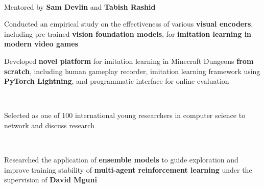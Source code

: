 \documentclass[]{lukas-cv-openfont}
\begin{document}
\noindent
{}
\\
\begin{tightitemize}{1.7em}
    \item Mentored by \textbf{Sam Devlin} and \textbf{Tabish Rashid}
    \item Conducted an empirical study on the effectiveness of various \textbf{visual encoders}, including pre-trained \textbf{vision foundation models}, for \textbf{imitation learning in modern video games} \cite{schaefer2023visual}
    \item Developed \textbf{novel platform} for imitation learning in Minecraft Dungeons \textbf{from scratch}, including human gameplay recorder, imitation learning framework using \textbf{PyTorch Lightning}, and programmatic interface for online evaluation
\end{tightitemize}
\sectionsep

\noindent
{}
\\
\begin{tightitemize}{1.7em}
    \item Selected as one of 100 international young researchers in computer science to network and discuss research
\end{tightitemize}
\sectionsep

\noindent
{}
\\
\begin{tightitemize}{1.7em}
    \item Researched the application of \textbf{ensemble models} to guide exploration and improve training stability of \textbf{multi-agent reinforcement learning} under the supervision of \textbf{David Mguni} \cite{schaefer2023emax}
\end{tightitemize}
\sectionsep
\end{document}
